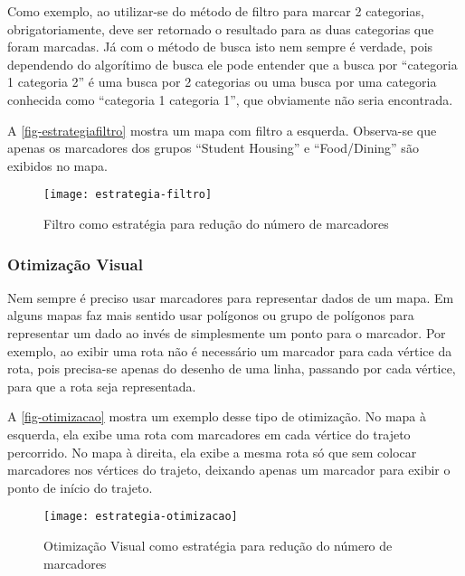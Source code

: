 	Como exemplo, ao utilizar-se do método de filtro para marcar 2 categorias, obrigatoriamente, deve ser retornado o resultado para as duas categorias que foram marcadas. Já com o método de busca isto nem sempre é verdade, pois dependendo do algorítimo de busca ele pode entender que a busca por ``categoria 1 categoria 2'' é uma busca por 2 categorias ou uma busca por uma categoria conhecida como ``categoria 1 categoria 1'', que obviamente não seria encontrada. 
	
	A \autoref{fig-estrategiafiltro} mostra um mapa com filtro a esquerda. Observa-se que apenas os marcadores dos grupos  ``Student Housing'' e ``Food/Dining''  são exibidos no mapa.
	 \begin{figure}[htb]
	\caption{\label{fig-estrategiafiltro}Filtro como estratégia para redução do número de marcadores}
	\begin{center}
	    \texttt{[image: estrategia-filtro]}
	\end{center}
	\end{figure}
	 
	\subsubsection{Otimização Visual}
	Nem sempre é preciso usar marcadores para representar dados de um mapa. Em alguns mapas faz mais sentido usar polígonos ou grupo de polígonos para representar um dado ao invés de simplesmente um ponto para o marcador. Por exemplo, ao exibir uma rota  não é necessário um marcador para cada vértice da rota, pois precisa-se apenas do desenho de uma linha, passando por cada vértice, para que a rota seja representada.
	
	A \autoref{fig-otimizacao} mostra um exemplo desse tipo de otimização. No mapa à esquerda, ela exibe uma rota com marcadores em cada vértice do trajeto percorrido. No mapa à direita, ela exibe a mesma rota só que sem colocar marcadores nos vértices do trajeto, deixando apenas um marcador para exibir o ponto de início do trajeto.
	
	 \begin{figure}[htb]
	\caption{\label{fig-otimizacao}Otimização Visual como estratégia para redução do número de marcadores}
	\begin{center}
	    \texttt{[image: estrategia-otimizacao]}
	\end{center}
	\end{figure}
	
